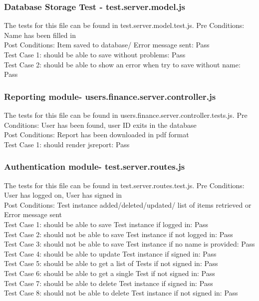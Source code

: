 \documentclass[a4paper,12pt]{article}
\begin{document}
\subsubsection{Database Storage Test - test.server.model.js}
The tests for this file can be found in test.server.model.test.js.
Pre Conditions: Name has been filled in\\
Post Conditions: Item saved to database/ Error message sent: Pass \\
Test Case 1: should be able to save without problems: Pass\\
Test Case 2:  should be able to show an error when try to save without name: Pass\\

\subsubsection{ Reporting module- users.finance.server.controller.js}
The tests for this file can be found in users.finance.server.controller.tests.js.
Pre Conditions: User has been found, user ID exits in the database \\
Post Conditions: Report has been downloaded in pdf format\\
Test Case 1: should render jsreport: Pass \\

\subsubsection{ Authentication module- test.server.routes.js}
The tests for this file can be found in test.server.routes.test.js.
Pre Conditions: User has logged on, User has signed in\\
Post Conditions: Test instance added/deleted/updated/ list of items retrieved or Error message sent \\
Test Case 1: should be able to save Test instance if logged in: Pass\\
Test Case 2: should not be able to save Test instance if not logged in: Pass\\
Test Case 3: should not be able to save Test instance if no name is provided: Pass\\
Test Case 4: should be able to update Test instance if signed in: Pass\\
Test Case 5: should be able to get a list of Tests if not signed in: Pass\\
Test Case 6: should be able to get a single Test if not signed in: Pass\\
Test Case 7: should be able to delete Test instance if signed in: Pass\\
Test Case 8: should not be able to delete Test instance if not signed in: Pass
\end{document}
